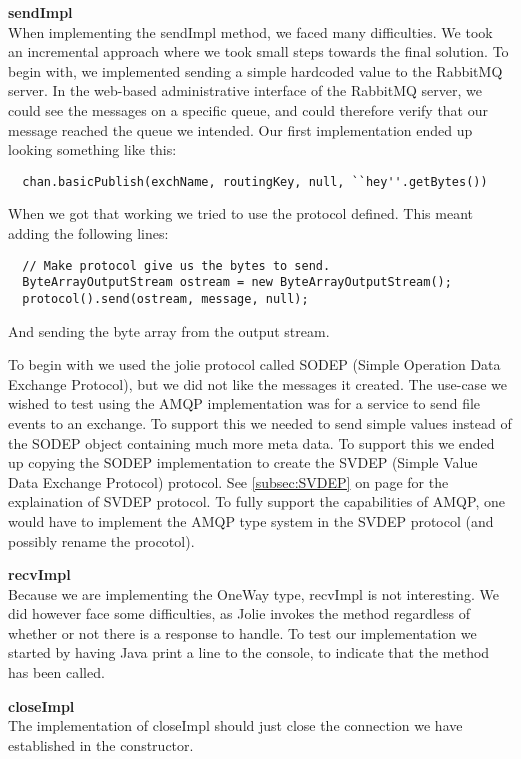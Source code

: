 \noindent\textbf{sendImpl}\\
When implementing the sendImpl method, we faced many difficulties. We took an incremental approach where we took small steps towards the final solution. To begin with, we implemented sending a simple hardcoded value to the RabbitMQ server. In the web-based administrative interface of the RabbitMQ server, we could see the messages on a specific queue, and could therefore verify that our message reached the queue we intended. Our first implementation ended up looking something like this:
\begin{lstlisting}
  chan.basicPublish(exchName, routingKey, null, ``hey''.getBytes())
\end{lstlisting}

When we got that working we tried to use the protocol defined. This meant adding the following lines:
\begin{lstlisting}
  // Make protocol give us the bytes to send.
  ByteArrayOutputStream ostream = new ByteArrayOutputStream();
  protocol().send(ostream, message, null);
\end{lstlisting}
And sending the byte array from the output stream.

To begin with we used the jolie protocol called SODEP (Simple Operation Data Exchange Protocol)\cite{SODEP}, but we did not like the messages it created. The use-case we wished to test using the AMQP implementation was for a service to send file events to an exchange. To support this we needed to send simple values instead of the SODEP object containing much more meta data. To support this we ended up copying the SODEP implementation to create the SVDEP (Simple Value Data Exchange Protocol) protocol.
See \ref{subsec:SVDEP} on page \pageref{subsec:SVDEP} for the explaination of SVDEP protocol. To fully support the capabilities of AMQP, one would have to implement the AMQP type system in the SVDEP protocol (and possibly rename the procotol).

\noindent\textbf{recvImpl}\\
Because we are implementing the OneWay type, recvImpl is not interesting. We did however face some difficulties, as Jolie invokes the method regardless of whether or not there is a response to handle. To test our implementation we started by having Java print a line to the console, to indicate that the method has been called.

\noindent\textbf{closeImpl}\\
The implementation of closeImpl should just close the connection we have established in the constructor.

